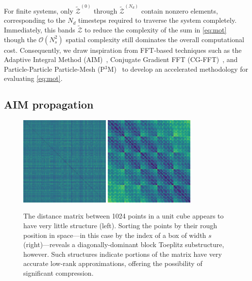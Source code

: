 For finite systems, only $\tilde{\mathcal{Z}}^{(0)}$ through $\tilde{\mathcal{Z}}^{(N_d)}$ contain nonzero elements, corresponding to the $N_d$ timesteps required to traverse the system completely.
Immediately, this bands $\tilde{\mathcal{Z}}$ to reduce the complexity of the sum in \cref{eq:mot} though the $\mathcal{O}(N_s^2)$ spatial complexity still dominates the overall computational cost.
Consequently, we draw inspiration from FFT-based techniques such as the Adaptive Integral Method (AIM)~\cite{AIM}, Conjugate Gradient FFT (CG-FFT)~\cite{CG-FFT}, and Particle-Particle Particle-Mesh (P$^3$M)~\cite{p cubed m} to develop an accelerated methodology for evaluating \cref{eq:mot}.

\subsection{AIM propagation}

\begin{figure}
  \centering
  \includegraphics[width=0.4\textwidth]{figures/dist_mat_unsorted}
  \hspace{1cm}
  \includegraphics[width=0.4\textwidth]{figures/dist_mat_sorted}
  \caption{\label{fig:matrix structure} The distance matrix between 1024 points in a unit cube appears to have very little structure (left).
    Sorting the points by their rough position in space---in this case by the index of a box of width $s$ (right)---reveals a diagonally-dominant block Toeplitz substructure, however.
    Such structures indicate portions of the matrix have very accurate low-rank approximations, offering the possibility of significant compression.
  }
\end{figure}

